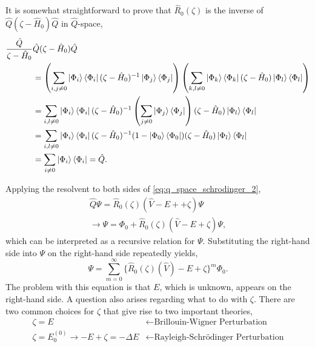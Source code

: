 It is somewhat straightforward to prove that $\hat{R}_0(\zeta)$ is the inverse of
$\hat{Q}(\zeta - \hat{H}_0)\hat{Q}$ in $\hat{Q}$-space,
\begin{equation}
    \begin{aligned}
        \frac{\hat{Q}}{\zeta - \hat{H}_0} &\hat{Q}(\zeta - \hat{H}_0)\hat{Q} \\
            &= \left(
                \sum_{i,j \neq 0} \ket{\Phi_i}\bra{\Phi_i}
                    (\zeta - \hat{H}_0)^{-1} \ket{\Phi_j}\bra{\Phi_j}
            \right) \left(
                \sum_{k,l \neq 0} \ket{\Phi_k}\bra{\Phi_k}
                    (\zeta - \hat{H}_0) \ket{\Phi_l}\bra{\Phi_l}
            \right) \\
            &= \sum_{i,l \neq 0} \ket{\Phi_i}
                \bra{\Phi_i}
                    (\zeta - \hat{H}_0)^{-1}
                    \left(\sum_{j \neq 0} \ket{\Phi_j} \bra{\Phi_j} \right)
                    (\zeta - \hat{H}_0)
                \ket{\Phi_l}
            \bra{\Phi_l} \\
            &= \sum_{i, l \neq 0} \ket{\Phi_i}
                \bra{\Phi_i} (\zeta - \hat{H}_0)^{-1}
                (1 - \ket{\Phi_0}\bra{\Phi_0})
                (\zeta - \hat{H}_0) \ket{\Phi_l}
            \bra{\Phi_l} \\
            &= \sum_{i \neq 0} \ket{\Phi_i}\bra{\Phi_i} = \hat{Q}.
    \end{aligned}
\end{equation}

Applying the resolvent to both sides of \autoref{eq:q_space_schrodinger_2},
\begin{equation}
    \begin{gathered}
    \hat{Q}\Psi = \hat{R}_0(\zeta)(\hat{V} - E + + \zeta)\Psi \\
    \to \Psi = \Phi_0 + \hat{R}_0(\zeta)(\hat{V} - E + \zeta)\Psi,
    \end{gathered}
\end{equation}
which can be interpreted as a recursive relation for $\Psi$. Substituting the
right-hand side into $\Psi$ on the right-hand side repeatedly yields,
\begin{equation}
    \Psi = \sum_{m=0}^\infty \{\hat{R}_0(\zeta)(\hat{V}) - E + \zeta \}^m \Phi_0.
\end{equation}
The problem with this equation is that $E$, which is unknown, appears on the right-hand
side. A question also arises regarding what to do with $\zeta$. There are two common 
choices for $\zeta$ that give rise to two important theories,
\begin{align*}
    \zeta = E &\leftarrow \text{Brillouin-Wigner Perturbation} \\
    \zeta = E^{(0)}_0 \to -E + \zeta = -\Delta E 
        &\leftarrow \text{Rayleigh-Schrödinger Perturbation}
\end{align*}

